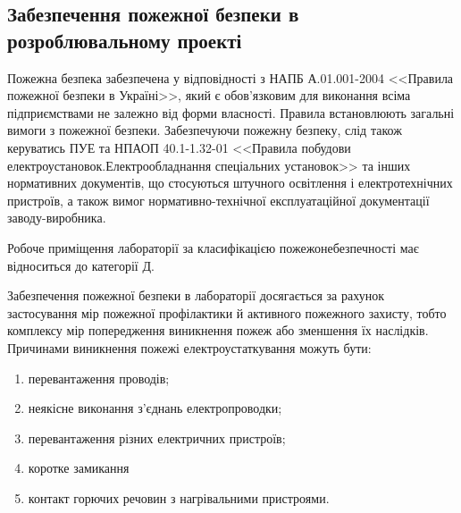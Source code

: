 \documentclass[ukrainian,utf8,simple,floatsubsection, hpadding=5mm,equationsubsection,]{eskdtext}
\begin{document}
\subsection{Забезпечення пожежної безпеки в розроблювальному проекті}
Пожежна безпека забезпечена у відповідності з НАПБ А.01.001-2004 <<Правила пожежної безпеки в Україні>>, який є обов'язковим для виконання всіма підприємствами не залежно від форми власності. Правила встановлюють загальні вимоги з пожежної безпеки. Забезпечуючи пожежну безпеку, слід також керуватись ПУЕ та НПАОП 40.1-1.32-01 <<Правила побудови електроустановок.Електрообладнання спеціальних установок>> та інших нормативних документів, що стосуються штучного освітлення і електротехнічних пристроїв, а також вимог нормативно-технічної експлуатаційної документації заводу-виробника.

Робоче приміщення лабораторії за класифікацією пожежонебезпечності має відноситься до категорії Д.

Забезпечення пожежної безпеки в лабораторії досягається за рахунок застосування мір пожежної профілактики 
й активного пожежного захисту, тобто комплексу мір попередження виникнення пожеж або зменшення їх наслідків. Причинами виникнення пожежі електроустаткування можуть бути:
\begin{enumerate}
 \item перевантаження проводів;
 \item неякісне виконання з'єднань електропроводки;
 \item перевантаження різних електричних пристроїв;
 \item коротке замикання
 \item контакт горючих речовин з нагрівальними пристроями.
\end{enumerate}




\end{document}
